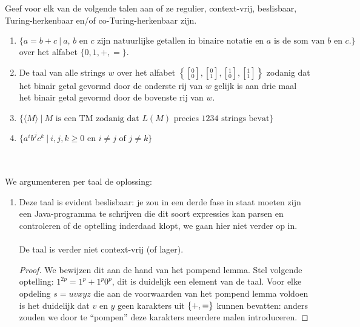 \documentclass[a4paper]{article}
\newcommand{\twar}[2]{\left[ { }^{#1}_{#2} \right] }
\begin{document}
\begin{question}
Geef voor elk van de volgende talen aan of ze regulier, context-vrij, beslisbaar, Turing-herkenbaar en/of co-Turing-herkenbaar zijn.
\begin{enumerate}
  \item $\{ a = b+c \  | \ \text{$a$, $b$ en $c$ zijn natuurlijke getallen in binaire notatie en $a$ is de som van $b$ en $c$.} \}$ over het alfabet $\{0,1,+,=\}$.
  \item De taal van alle strings $w$ over het alfabet $\left\{ \twar{0}{0}, \twar{0}{1}, \twar{1}{0}, \twar{1}{1} \right\}$ zodanig dat het binair getal gevormd door de onderste rij van $w$ gelijk is aan drie maal het binair getal gevormd door de bovenste rij van $w$. 
  \item $\{ \langle M \rangle \ | \ \text{$M$ is een TM zodanig dat $L(M)$ precies 1234 strings bevat} \}$ %
  \item $\{ a^ib^jc^k \ | \ \text{$i,j,k \geq 0$ en $i \neq j$ of $j \neq k$} \}$ 
\end{enumerate}
\begin{answer}~~
\paragraph{}
We argumenteren per taal de oplossing:
\begin{enumerate}
 \item Deze taal is evident beslisbaar: je zou in een derde fase in staat moeten zijn een Java-programma te schrijven die dit soort expressies kan parsen en controleren of de optelling inderdaad klopt, we gaan hier niet verder op in.
 \paragraph{}De taal is verder niet context-vrij (of lager).
 \begin{proof}
  We bewijzen dit aan de hand van het pompend lemma. Stel volgende optelling: $1^{2p}=1^p+1^p0^p$, dit is duidelijk een element van de taal. Voor elke opdeling $s=uvxyz$ die aan de voorwaarden van het pompend lemma voldoen is het duidelijk dat $v$ en $y$ geen karakters uit $\left\{ +,= \right\}$ kunnen bevatten: anders zouden we door te ``pompen'' deze karakters meerdere malen introduceren.

\end{proof}
\end{enumerate}
\end{answer}
\end{question}
\end{document}
